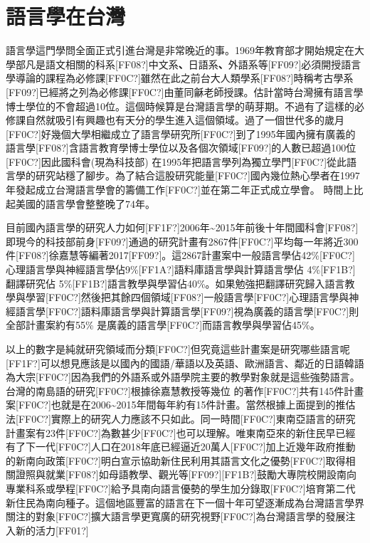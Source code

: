 \section{語言學在台灣} %

語言學這門學問全面正式引進台灣是非常晚近的事。1969年教育部才開始規定在大學部凡是語文相關的科系[FF08?]中文系\textbf{、}日語系\textbf{、}外語系等[FF09?]必須開授語言學導論的課程為必修課[FF0C?]雖然在此之前台大人類學系[FF08?]時稱考古學系[FF09?]已經將之列為必修課[FF0C?]由董同龢老師授課。估計當時台灣擁有語言學博士學位的不會超過10位。這個時候算是台灣語言學的萌芽期。不過有了這樣的必修課自然就吸引有興趣也有天分的學生進入這個領域。過了一個世代多的歲月[FF0C?]好幾個大學相繼成立了語言學研究所[FF0C?]到了1995年國內擁有廣義的語言學[FF08?]含語言教育學博士學位以及各個次領域[FF09?]的人數已超過100位[FF0C?]因此國科會(現為科技部) 在1995年把語言學列為獨立學門[FF0C?]從此語言學的研究站穩了腳步。為了結合這股研究能量[FF0C?]國內幾位熱心學者在1997年發起成立台灣語言學會的籌備工作[FF0C?]並在第二年正式成立學會。 時間上比起美國的語言學會整整晚了74年。

目前國內語言學的研究人力如何[FF1F?]2006年{\textasciitilde}2015年前後十年間國科會[FF08?]即現今的科技部前身[FF09?]通過的研究計畫有2867件[FF0C?]平均每一年將近300件[FF08?]徐嘉慧等編著2017[FF09?]。這2867計畫案中一般語言學佔42\%[FF0C?]心理語言學與神經語言學佔9\%[FF1A?]語料庫語言學與計算語言學佔 4\%[FF1B?]翻譯研究佔 5\%[FF1B?]語言教學與學習佔40\%。如果勉強把翻譯研究歸入語言教學與學習[FF0C?]然後把其餘四個領域[FF08?]一般語言學[FF0C?]心理語言學與神經語言學[FF0C?]語料庫語言學與計算語言學[FF09?]視為廣義的語言學[FF0C?]則全部計畫案約有55\% 是廣義的語言學[FF0C?]而語言教學與學習佔45\%。

以上的數字是純就研究領域而分類[FF0C?]但究竟這些計畫案是研究哪些語言呢[FF1F?]可以想見應該是以國內的國語/華語以及英語、歐洲語言、鄰近的日語韓語為大宗[FF0C?]因為我們的外語系或外語學院主要的教學對象就是這些強勢語言。台灣的南島語的研究[FF0C?]根據徐嘉慧教授等幾位  的著作[FF0C?]共有145件計畫案[FF0C?]也就是在2006{\textasciitilde}2015年間每年約有15件計畫。當然根據上面提到的推估法[FF0C?]實際上的研究人力應該不只如此。同一時間[FF0C?]東南亞語言的研究計畫案有23件[FF0C?]為數甚少[FF0C?]也可以理解。唯東南亞來的新住民早已經有了下一代[FF0C?]人口在2018年底已經逼近20萬人[FF0C?]加上近幾年政府推動的新南向政策[FF0C?]明白宣示協助新住民利用其語言文化之優勢[FF0C?]取得相關證照與就業[FF08?]如母語教學、觀光等[FF09?][FF1B?]鼓勵大專院校開設南向專業科系或學程[FF0C?]給予具南向語言優勢的學生加分錄取[FF0C?]培育第二代新住民為南向種子。這個地區豐富的語言在下一個十年可望逐漸成為台灣語言學界關注的對象[FF0C?]擴大語言學更寬廣的研究視野[FF0C?]為台灣語言學的發展注入新的活力[FF01?]

